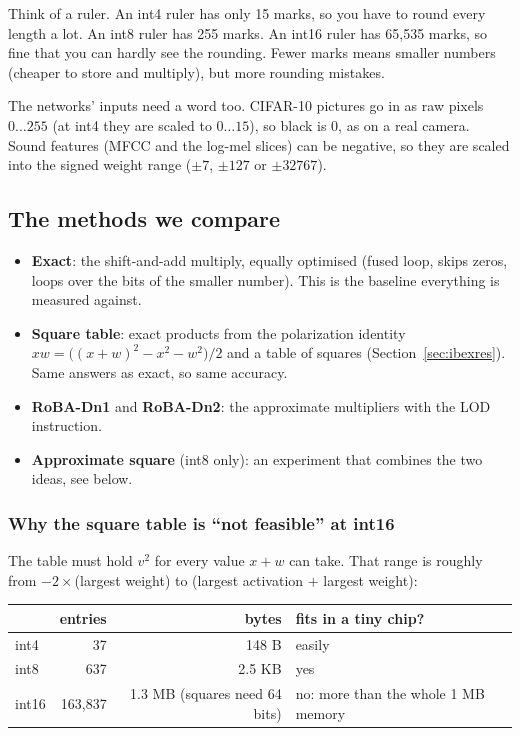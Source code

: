 \begin{kid}
Think of a ruler. An int4 ruler has only 15 marks, so you have to round every length a lot. An int8 ruler has
255 marks. An int16 ruler has 65{,}535 marks, so fine that you can hardly see the rounding. Fewer marks means
smaller numbers (cheaper to store and multiply), but more rounding mistakes.
\end{kid}

The networks' inputs need a word too. CIFAR-10 pictures go in as raw pixels $0 \dots 255$ (at int4 they are
scaled to $0 \dots 15$), so black is 0, as on a real camera. Sound features (MFCC and the log-mel slices) can be
negative, so they are scaled into the signed weight range ($\pm7$, $\pm127$ or $\pm32767$).

\subsection{The methods we compare}

\begin{itemize}
  \item \textbf{Exact}: the shift-and-add multiply, equally optimised (fused loop, skips zeros, loops over the
        bits of the smaller number). This is the baseline everything is measured against.
  \item \textbf{Square table}: exact products from the polarization identity
        $xw = \big((x+w)^2 - x^2 - w^2\big)/2$ and a table of squares (Section~\ref{sec:ibexres}). Same answers
        as exact, so same accuracy.
  \item \textbf{RoBA-Dn1} and \textbf{RoBA-Dn2}: the approximate multipliers with the LOD instruction.
  \item \textbf{Approximate square} (int8 only): an experiment that combines the two ideas, see below.
\end{itemize}

\subsubsection*{Why the square table is ``not feasible'' at int16}

The table must hold $v^2$ for every value $x+w$ can take. That range is roughly from $-2\times$(largest weight)
to (largest activation $+$ largest weight):

\begin{center}
\small
\begin{tabular}{lrrl}
\toprule
 & entries & bytes & fits in a tiny chip?\\
\midrule
int4 & 37 & 148 B & easily\\
int8 & 637 & 2.5 KB & yes\\
int16 & 163{,}837 & 1.3 MB (squares need 64 bits) & no: more than the whole 1 MB memory\\
\bottomrule
\end{tabular}
\end{center}

